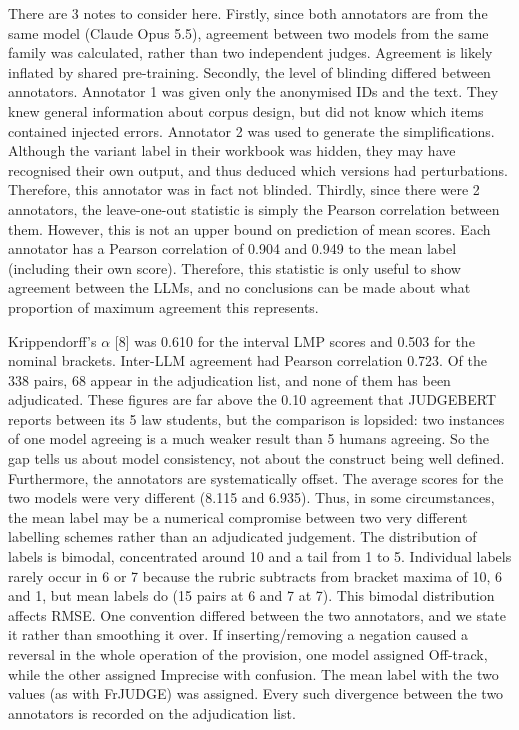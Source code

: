 \documentclass[conference]{IEEEtran}
\begin{document}
There are 3 notes to consider here. Firstly, since both annotators are from the same model (Claude Opus 5.5), agreement between two models from the same family was calculated, rather than two independent judges. Agreement is likely inflated by shared pre-training. Secondly, the level of blinding differed between annotators. Annotator 1 was given only the anonymised IDs and the text. They knew general information about corpus design, but did not know which items contained injected errors. Annotator 2 was used to generate the simplifications. Although the variant label in their workbook was hidden, they may have recognised their own output, and thus deduced which versions had perturbations. Therefore, this annotator was in fact not blinded. Thirdly, since there were 2 annotators, the leave-one-out statistic is simply the Pearson correlation between them. However, this is not an upper bound on prediction of mean scores. Each annotator has a Pearson correlation of 0.904 and 0.949 to the mean label (including their own score). Therefore, this statistic is only useful to show agreement between the LLMs, and no conclusions can be made about what proportion of maximum agreement this represents.

Krippendorff’s \ensuremath{\alpha} [8] was 0.610 for the interval LMP scores and 0.503 for the nominal brackets. Inter-LLM agreement had Pearson correlation 0.723. Of the 338 pairs, 68 appear in the adjudication list, and none of them has been adjudicated. These figures are far above the 0.10 agreement that JUDGEBERT reports between its 5 law students, but the comparison is lopsided: two instances of one model agreeing is a much weaker result than 5 humans agreeing. So the gap tells us about model consistency, not about the construct being well defined. Furthermore, the annotators are systematically offset. The average scores for the two models were very different (8.115 and 6.935). Thus, in some circumstances, the mean label may be a numerical compromise between two very different labelling schemes rather than an adjudicated judgement. The distribution of labels is bimodal, concentrated around 10 and a tail from 1 to 5. Individual labels rarely occur in 6 or 7 because the rubric subtracts from bracket maxima of 10, 6 and 1, but mean labels do (15 pairs at 6 and 7 at 7). This bimodal distribution affects RMSE. One convention differed between the two annotators, and we state it rather than smoothing it over. If inserting/removing a negation caused a reversal in the whole operation of the provision, one model assigned Off-track, while the other assigned Imprecise with confusion. The mean label with the two values (as with FrJUDGE) was assigned. Every such divergence between the two annotators is recorded on the adjudication list.
\end{document}
